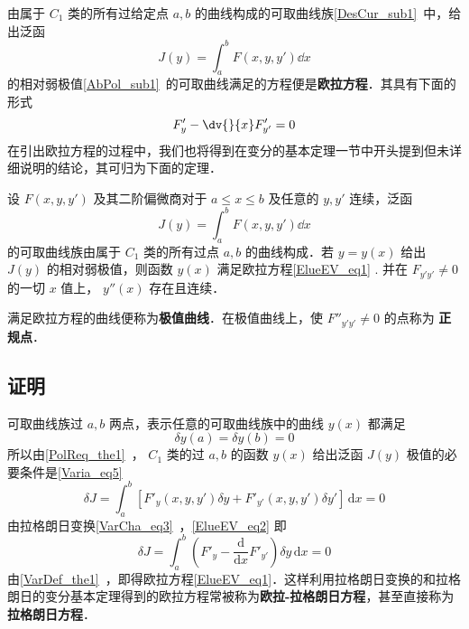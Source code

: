 
由属于 $C_1$ 类的所有过给定点 $a,b$ 的曲线构成的可取曲线族\autoref{DesCur_sub1}~中，给出泛函 
\begin{equation}
J(y)=\int_a^bF(x,y,y')\dd x
\end{equation}
的相对弱极值\autoref{AbPol_sub1}~的可取曲线满足的方程便是\textbf{欧拉方程}．其具有下面的形式
\begin{equation}\label{ElueEV_eq1}
F'_y-\dv{}{x}F'_{y'}=0
\end{equation}
在引出欧拉方程的过程中，我们也将得到在变分的基本定理一节中开头提到但未详细说明的结论，其可归为下面的定理．
\begin{theorem}{}
设 $F(x,y,y')$ 及其二阶偏微商对于 $a\leq x\leq b$ 及任意的 $y,y'$ 连续，泛函
\begin{equation}
J(y)=\int_a^b F(x,y,y')\dd x
\end{equation}
的可取曲线族由属于 $C_1$ 类的所有过点 $a,b$ 的曲线构成．若 $y=y(x)$ 给出 $J(y)$ 的相对弱极值，则函数 $y(x)$ 满足欧拉方程\autoref{ElueEV_eq1} .
并在 $F_{y'y'}\neq0$ 的一切 $x$ 值上， $y''(x)$ 存在且连续．

\end{theorem}
满足欧拉方程的曲线便称为\textbf{极值曲线}．在极值曲线上，使 $F''_{y'y'}\neq0$ 的点称为 \textbf{正规点}．
\subsection{证明}
可取曲线族过 $a,b$ 两点，表示任意的可取曲线族中的曲线 $y(x)$ 都满足 
\begin{equation}
\delta y(a)=\delta y(b)=0
\end{equation}
所以由\autoref{PolReq_the1}~， $C_1$ 类的过 $a,b$ 的函数 $y(x)$ 给出泛函 $J(y)$ 极值的必要条件是\autoref{Varia_eq5}~
\begin{equation}\label{ElueEV_eq2}
\delta J=\int_a^b \left[F'_y(x,y,y')\delta y+F'_{y'}(x,y,y')\delta y' \right]  \,\mathrm{d}{x} =0
\end{equation}
由拉格朗日变换\autoref{VarCha_eq3}~，\autoref{ElueEV_eq2} 即
\begin{equation}
\delta J=\int_a^b \left(F'_y- \frac{\mathrm{d}{}}{\mathrm{d}{x}} F'_{y'} \right) \delta y \,\mathrm{d}{x} =0
\end{equation}
由\autoref{VarDef_the1}~，即得欧拉方程\autoref{ElueEV_eq1}．这样利用拉格朗日变换的和拉格朗日的变分基本定理得到的欧拉方程常被称为\textbf{欧拉-拉格朗日方程}，甚至直接称为\textbf{拉格朗日方程}．

